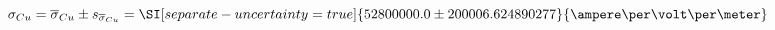 
\begin{equation}
    \sigma_{Cu}
        = \overline{\sigma}_{Cu} \pm s_{\overline{\sigma}_{Cu}}
        = \SI[separate-uncertainty = true]{52800000.0 \pm 200006.624890277 }{\ampere\per\volt\per\meter}
\end{equation}